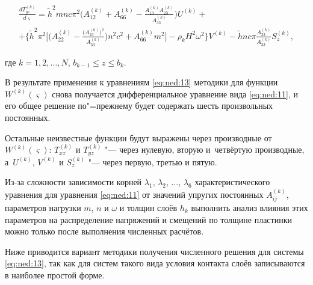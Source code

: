 
\begin{multline*}

\frac{{dT_{yz}^{(k)}}}{{d\varsigma}}=\tilde{h}^2mnc\pi ^2\biggl({A_{12}^{(k)}+A_{66}^{(k)} -\frac{{A_{13}^{(k)} A_{23}^{(k)}}}{{A_{33}^{(k)}}}}\biggr)U^{(k)} +\\ 

%

+\biggl\{ {\tilde h^2\pi ^2\biggl[ {\biggl({A_{22}^{(k)} -\frac{{\bigl({A_{23}^{(k)}}\bigr)^2}}{{A_{33}^{(k)}}}}\biggr)n^2 c^2+A_{66}^{(k)} m^2}\biggr]-\rho_k H^2\omega ^2}\biggr\}V^{(k)}

%

-\tilde hnc\pi\frac{{A_{23}^{(k)}}}{{A_{33}^{(k)}}}S_z^{(k)},

\end{multline*}

где $k=1, 2, \dots, N$, $b_{k-1}\le z\le b_k$.



В результате применения к уравнениям \eqref{eq:ned:13} методики \cite{ned2} для функции $W^{(k)}(\varsigma)$  снова получается дифференциальное уравнение вида \eqref{eq:ned:11}, и его общее решение по"=прежнему будет содержать шесть произвольных постоянных. 

Остальные неизвестные функции будут выражены через производные от  $W^{(k)}(\varsigma)$: $T_{xz}^{(k)}$ и $T_{yz}^{(k)}$ "--- через нулевую, вторую и~четвёртую производные, а~$U^{(k)}$, $V^{(k)}$ и $S_z^{(k)}$  "--- через первую, третью и пятую.



Из-за сложности зависимости корней $\lambda_1$, $\lambda_2$, $\dots$, $\lambda_6$ характеристического уравнения для уравнения \eqref{eq:ned:11} от значений упругих постоянных $A_{ij}^{(k)}$, параметров нагрузки $m$, $n$ и $\omega$ и толщин слоёв $h_k$ выполнить анализ влияния этих параметров на распределение напряжений и смещений по толщине пластинки можно только после выполнения численных расчётов. 


Ниже приводится вариант методики получения численного решения для системы \eqref{eq:ned:13}, так как для  систем такого вида условия контакта слоёв записываются в наиболее простой форме.





